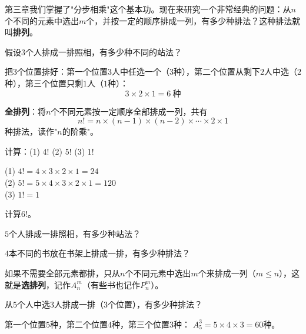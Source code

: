 
第三章我们掌握了"分步相乘"这个基本功。现在来研究一个非常经典的问题：从$n$个不同的元素中选出$m$个，并按一定的顺序排成一列，有多少种排法？这种排法就叫\textbf{排列}。


假设$3$个人排成一排照相，有多少种不同的站法？

把$3$个位置排好：第一个位置$3$人中任选一个（$3$种），第二个位置从剩下$2$人中选（$2$种），第三个位置只剩$1$人（$1$种）：
\[
3\times2\times1 = 6\ \text{种}
\]

\begin{center}
\end{center}

\textbf{全排列}：将$n$个不同元素按一定顺序全部排成一列，共有
\[
n! = n\times(n-1)\times(n-2)\times\cdots\times2\times1
\]
种排法，读作"$n$的阶乘"。

\begin{example}
计算：(1) $4!$ \qquad (2) $5!$ \qquad (3) $1!$
\end{example}
\begin{solution}
(1) $4! = 4\times3\times2\times1 = 24$\\
(2) $5! = 5\times4\times3\times2\times1 = 120$\\
(3) $1! = 1$
\end{solution}

\begin{exercise}
\item 计算$6!$。
\item $5$个人排成一排照相，有多少种站法？
\item $4$本不同的书放在书架上排成一排，有多少种排法？
\end{exercise}


如果不需要全部元素都排，只从$n$个不同元素中选出$m$个来排成一列（$m\le n$），这就是\textbf{选排列}，记作$A_n^m$（有些书也记作$P_n^m$）。

\begin{example}
从$5$个人中选$3$人排成一排（$3$个位置），有多少种排法？
\end{example}
\begin{solution}
第一个位置$5$种，第二个位置$4$种，第三个位置$3$种：
$A_5^3 = 5\times4\times3 = 60$种。
\end{solution}

